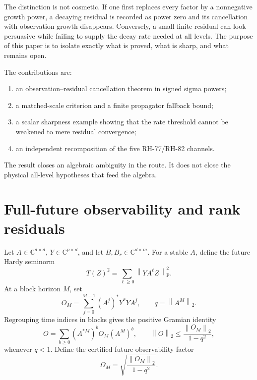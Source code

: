 \documentclass[11pt]{article}
\theoremstyle{definition}
\theoremstyle{remark}
\newcommand{\norm}[1]{\left\lVert#1\right\rVert}
\newcommand{\F}{\mathrm F}
\begin{document}
The distinction is not cosmetic.  If one first replaces every factor by a
nonnegative growth power, a decaying residual is recorded as power zero and
its cancellation with observation growth disappears.  Conversely, a small
finite residual can look persuasive while failing to supply the decay rate
needed at all levels.  The purpose of this paper is to isolate exactly what
is proved, what is sharp, and what remains open.

The contributions are:
\begin{enumerate}[leftmargin=2.2em]
 \item an observation--residual cancellation theorem in signed sigma powers;
 \item a matched-scale criterion and a finite propagator fallback bound;
 \item a scalar sharpness example showing that the rate threshold cannot be
       weakened to mere residual convergence;
 \item an independent recomposition of the five RH-77/RH-82 channels.
\end{enumerate}

The result closes an algebraic ambiguity in the route.  It does not close the
physical all-level hypotheses that feed the algebra.

\section{Full-future observability and rank residuals}
\label{sec:setup}

Let $A\in\mathbb C^{d\times d}$, $Y\in\mathbb C^{p\times d}$, and let
$B,B_r\in\mathbb C^{d\times m}$.  For a stable $A$, define the future Hardy
seminorm
\begin{equation}
 T(Z)^2=\sum_{\ell\ge0}\norm{YA^\ell Z}_{\F}^2.
 \label{eq:T}
\end{equation}
At a block horizon $M$, set
\begin{equation}
 O_M=\sum_{j=0}^{M-1}(A^j)^*Y^*YA^j,
 \qquad q=\norm{A^M}_2.
 \label{eq:OM}
\end{equation}
Regrouping time indices in blocks gives the positive Gramian identity
\begin{equation}
 O=\sum_{b\ge0}(A^{*M})^bO_M(A^M)^b,
 \qquad
 \norm O_2\le\frac{\norm{O_M}_2}{1-q^2},
 \label{eq:O}
\end{equation}
whenever $q<1$.  Define the certified future observability factor
\begin{equation}
 \Omega_M=\sqrt{\frac{\norm{O_M}_2}{1-q^2}}.
 \label{eq:Omega}
\end{equation}
\end{document}
